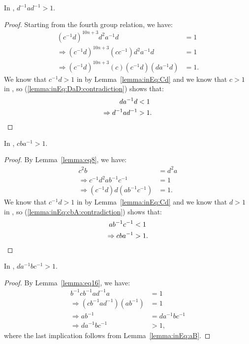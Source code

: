 \begin{lemma} In , $d^{-1}ad^{-1}>1$.
\label{lemma:inEq:DaD}
\end{lemma}
\begin{proof}
Starting from the fourth group relation, we have:
\begin{align}
(c^{-1}d)^{10n+3}d^{2}a^{-1}d&=1\nonumber{}\\
\Rightarrow{}(c^{-1}d)^{10n+3}(cc^{-1})d^{2}a^{-1}d&=1\nonumber{}\\
\Rightarrow{}(c^{-1}d)^{10n+3}(c)(c^{-1}d)(da^{-1}d)&=1.\label{lemma:inEq:DaD:contradiction}
\end{align}
We know that $c^{-1}d>1$ in  by Lemma~\ref{lemma:inEq:Cd} and we know that $c>1$ in , so (\ref{lemma:inEq:DaD:contradiction}) shows that:
\begin{align*}
da^{-1}d&<1\\
\Rightarrow{}d^{-1}ad^{-1}&>1.\qedhere
\end{align*}
\end{proof}

\begin{lemma} In , $cba^{-1}>1$.
\label{lemma:inEq:cbA}
\end{lemma}

\begin{proof} By Lemma~\ref{lemma:eq8}, we have:
\begin{align}
c^{2}b&=d^{2}a\nonumber{}\\
\Rightarrow{}c^{-1}d^{2}ab^{-1}c^{-1}&= 1\nonumber{}\\
\Rightarrow{}(c^{-1}d)d(ab^{-1}c^{-1})&=1.\label{lemma:inEq:cbA:contradiction}
\end{align}
We know that $c^{-1}d>1$ in  by Lemma~\ref{lemma:inEq:Cd} and we know that $d>1$ in , so (\ref{lemma:inEq:cbA:contradiction}) shows that:
\begin{align*}
ab^{-1}c^{-1}&<1\\
\Rightarrow{}cba^{-1}&>1.\qedhere
\end{align*}
\end{proof}

\begin{lemma} In , $da^{-1}bc^{-1}>1$.
\label{lemma:inEq:dAbC}
\end{lemma}
\begin{proof} By Lemma~\ref{lemma:eq16}, we have:
\begin{align*}
b^{-1}cb^{-1}ad^{-1}a &= 1\\
\Rightarrow{}(cb^{-1}ad^{-1})(ab^{-1}) &=1\\
\Rightarrow{}ab^{-1}&=da^{-1}bc^{-1}\\
\Rightarrow{}da^{-1}bc^{-1}&>1,
\end{align*}
where the last implication follows from Lemma~\ref{lemma:inEq:aB}.
\end{proof}

